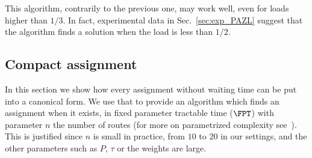 \documentclass[a4paper,10pt]{article}
\begin{document}
% 
% 
% 
	
This algorithm, contrarily to the previous one, may work well, even for loads higher than $1/3$.
In fact, experimental data in Sec.~\ref{sec:exp_PAZL} suggest that the algorithm finds a solution when the load is less than $1/2$.


\subsection{Compact assignment}

In this section we show how every assignment without waiting time can be put into a canonical form.
We use that to provide an algorithm which finds an assignment when it exists, in fixed parameter tractable time ($\FPT$) with parameter $n$ the number of routes (for more on parametrized complexity see~\cite{downey2012parameterized}). This is justified since $n$ is small in practice, from $10$ to $20$ in our settings, and the other parameters such as $P$, $\tau$ or the weights are large.
\end{document}

